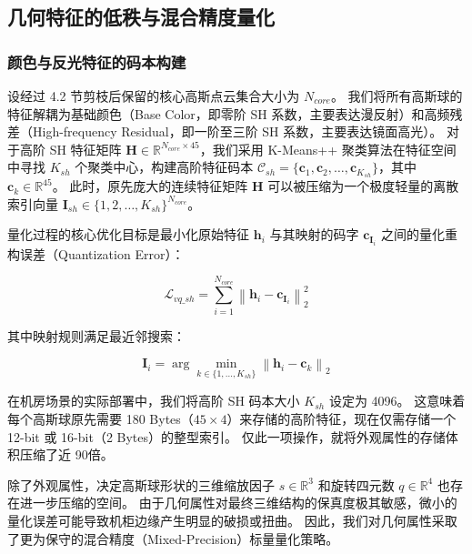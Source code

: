 \subsection{几何特征的低秩与混合精度量化}
\label{subsec:geometry_quantization}

\subsubsection{颜色与反光特征的码本构建}
设经过 4.2 节剪枝后保留的核心高斯点云集合大小为 $N_{core}$。
我们将所有高斯球的特征解耦为基础颜色（Base Color，即零阶 SH 系数，主要表达漫反射）和高频残差（High-frequency Residual，即一阶至三阶 SH 系数，主要表达镜面高光）。
对于高阶 SH 特征矩阵 $\mathbf{H} \in \mathbb{R}^{N_{core} \times 45}$，我们采用 K-Means++ 聚类算法在特征空间中寻找 $K_{sh}$ 个聚类中心，构建高阶特征码本 $\mathcal{C}_{sh} = \{ \mathbf{c}_1, \mathbf{c}_2, \dots, \mathbf{c}_{K_{sh}} \}$，其中 $\mathbf{c}_k \in \mathbb{R}^{45}$。
此时，原先庞大的连续特征矩阵 $\mathbf{H}$ 可以被压缩为一个极度轻量的离散索引向量 $\mathbf{I}_{sh} \in \{1, 2, \dots, K_{sh}\}^{N_{core}}$。




量化过程的核心优化目标是最小化原始特征 $\mathbf{h}_i$ 与其映射的码字 $\mathbf{c}_{\mathbf{I}_i}$ 之间的量化重构误差（Quantization Error）：

\begin{equation}
    \mathcal{L}_{vq\_sh} = \sum_{i=1}^{N_{core}} \left\| \mathbf{h}_i - \mathbf{c}_{\mathbf{I}_i} \right\|_2^2
\end{equation}


其中映射规则满足最近邻搜索：

\begin{equation}
    \mathbf{I}_i = \arg\min_{k \in \{1, \dots, K_{sh}\}} \left\| \mathbf{h}_i - \mathbf{c}_k \right\|_2
\end{equation}

在机房场景的实际部署中，我们将高阶 SH 码本大小 $K_{sh}$ 设定为 4096。
这意味着每个高斯球原先需要 180 Bytes（$45 \times 4$）来存储的高阶特征，现在仅需存储一个 12-bit 或 16-bit（2 Bytes）的整型索引。
仅此一项操作，就将外观属性的存储体积压缩了近 90倍。


除了外观属性，决定高斯球形状的三维缩放因子 $s \in \mathbb{R}^3$ 和旋转四元数 $q \in \mathbb{R}^4$ 也存在进一步压缩的空间。
由于几何属性对最终三维结构的保真度极其敏感，微小的量化误差可能导致机柜边缘产生明显的破损或扭曲。
因此，我们对几何属性采取了更为保守的混合精度（Mixed-Precision）标量量化策略。

